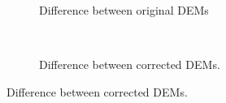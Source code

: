 \documentclass[12pt]{article}
\begin{document}
\begin{figure}[H]
    \centering
    \begin{subfigure}[b]{0.48\textwidth}
        \caption{Difference between original DEMs}
        \label{fig:DEMdifferenceOriginal}
    \end{subfigure}
    ~
    \begin{subfigure}[b]{0.48\textwidth}
        \caption{Difference between corrected DEMs.}
        \label{fig:DEMdifferenceCorrected}
    \end{subfigure}


\end{figure}
\end{document}
